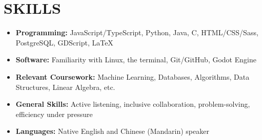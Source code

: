 \documentclass[letterpaper,10pt]{extarticle}
\begin{document}
\section*{SKILLS}
\begin{itemize}
    \item \textbf{Programming:} JavaScript/TypeScript, Python, Java, C, HTML/CSS/Sass, PostgreSQL, GDScript, {\selectfont \LaTeX}
    \item \textbf{Software:} Familiarity with Linux, the terminal, Git/GitHub, Godot Engine
    \item \textbf{Relevant Coursework:} Machine Learning, Databases, Algorithms, Data Structures, Linear Algebra, etc.
    \item \textbf{General Skills:} Active listening, inclusive collaboration, problem-solving, efficiency under pressure
    \item \textbf{Languages:} Native English and Chinese (Mandarin) speaker
\end{itemize}

\end{document}
